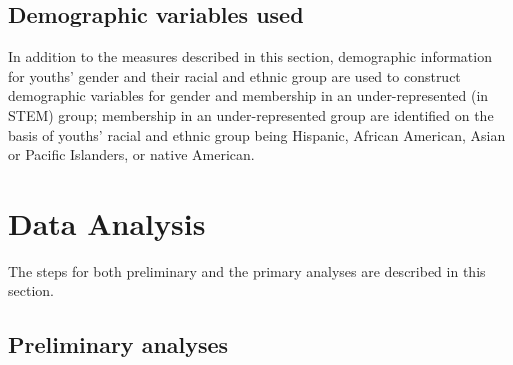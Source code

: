 \documentclass[]{msu-thesis}
\theoremstyle{definition}
\theoremstyle{definition}
\theoremstyle{definition}
\theoremstyle{remark}
\begin{document}
\begin{table}

\caption{\label{tab:unnamed-chunk-6}Coding Frame for Work With Data}
\centering
{}
\end{table}

\subsection{Demographic variables
used}\label{demographic-variables-used}

In addition to the measures described in this section, demographic
information for youths' gender and their racial and ethnic group are
used to construct demographic variables for gender and membership in an
under-represented (in STEM) group; membership in an under-represented
group are identified on the basis of youths' racial and ethnic group
being Hispanic, African American, Asian or Pacific Islanders, or native
American.

\section{Data Analysis}\label{data-analysis}

The steps for both preliminary and the primary analyses are described in
this section.

\subsection{Preliminary analyses}\label{preliminary-analyses}
\end{document}
